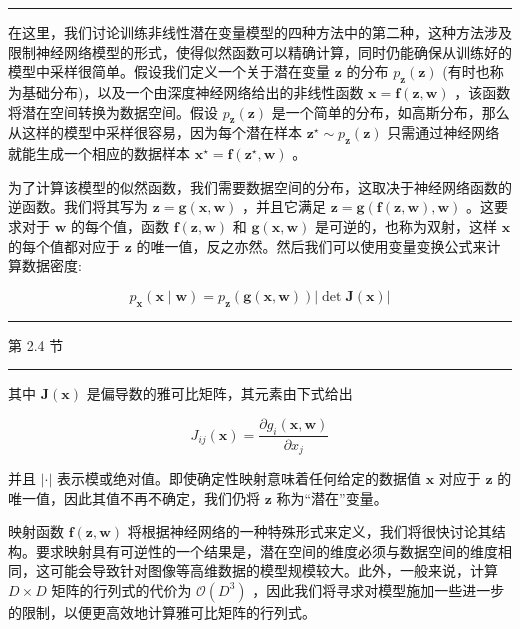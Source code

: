 \documentclass[10pt]{article}
\newcommand{\HRule}{\begin{center}\rule{0.9\linewidth}{0.2mm}\end{center}}
\begin{document}
\HRule

在这里，我们讨论训练非线性潜在变量模型的四种方法中的第二种，这种方法涉及限制神经网络模型的形式，使得似然函数可以精确计算，同时仍能确保从训练好的模型中采样很简单。假设我们定义一个关于潜在变量 \(\mathbf{z}\) 的分布 \({p}_{\mathbf{z}}\left( \mathbf{z}\right)\) (有时也称为基础分布)，以及一个由深度神经网络给出的非线性函数 \(\mathbf{x} = \mathbf{f}\left( {\mathbf{z},\mathbf{w}}\right)\) ，该函数将潜在空间转换为数据空间。假设 \({p}_{\mathbf{z}}\left( \mathbf{z}\right)\) 是一个简单的分布，如高斯分布，那么从这样的模型中采样很容易，因为每个潜在样本 \({\mathbf{z}}^{ \star  } \sim  {p}_{\mathbf{z}}\left( \mathbf{z}\right)\) 只需通过神经网络就能生成一个相应的数据样本 \({\mathbf{x}}^{ \star  } = \mathbf{f}\left( {{\mathbf{z}}^{ \star  },\mathbf{w}}\right)\) 。

为了计算该模型的似然函数，我们需要数据空间的分布，这取决于神经网络函数的逆函数。我们将其写为 \(\mathbf{z} = \mathbf{g}\left( {\mathbf{x},\mathbf{w}}\right)\) ，并且它满足 \(\mathbf{z} = \mathbf{g}\left( {\mathbf{f}\left( {\mathbf{z},\mathbf{w}}\right) ,\mathbf{w}}\right)\) 。这要求对于 \(\mathbf{w}\) 的每个值，函数 \(\mathbf{f}\left( {\mathbf{z},\mathbf{w}}\right)\) 和 \(\mathbf{g}\left( {\mathbf{x},\mathbf{w}}\right)\) 是可逆的，也称为双射，这样 \(\mathbf{x}\) 的每个值都对应于 \(\mathbf{z}\) 的唯一值，反之亦然。然后我们可以使用变量变换公式来计算数据密度:

\[
{p}_{\mathbf{x}}\left( {\mathbf{x} \mid  \mathbf{w}}\right)  = {p}_{\mathbf{z}}\left( {\mathbf{g}\left( {\mathbf{x},\mathbf{w}}\right) }\right) \left| {\det \mathbf{J}\left( \mathbf{x}\right) }\right|  \tag{18.1}
\]

\HRule

第 2.4 节

\HRule

其中 \(\mathbf{J}\left( \mathbf{x}\right)\) 是偏导数的雅可比矩阵，其元素由下式给出

\[
{J}_{ij}\left( \mathbf{x}\right)  = \frac{\partial {g}_{i}\left( {\mathbf{x},\mathbf{w}}\right) }{\partial {x}_{j}} \tag{18.2}
\]

并且 \(\left| \cdot \right|\) 表示模或绝对值。即使确定性映射意味着任何给定的数据值 \(\mathbf{x}\) 对应于 \(\mathbf{z}\) 的唯一值，因此其值不再不确定，我们仍将 \(\mathbf{z}\) 称为“潜在”变量。

映射函数 \(\mathbf{f}\left( {\mathbf{z},\mathbf{w}}\right)\) 将根据神经网络的一种特殊形式来定义，我们将很快讨论其结构。要求映射具有可逆性的一个结果是，潜在空间的维度必须与数据空间的维度相同，这可能会导致针对图像等高维数据的模型规模较大。此外，一般来说，计算 \(D \times  D\) 矩阵的行列式的代价为 \(\mathcal{O}\left( {D}^{3}\right)\) ，因此我们将寻求对模型施加一些进一步的限制，以便更高效地计算雅可比矩阵的行列式。
\end{document}
